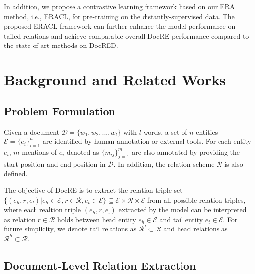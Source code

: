 \documentclass[11pt]{article}
\begin{document}
In addition, we propose a contrastive learning framework based on our ERA method, i.e., ERACL, for pre-training on the distantly-supervised data. The proposed ERACL framework can further enhance the model performance on tailed relations and achieve comparable overall DocRE performance compared to the state-of-art methods on DocRED.

\section{Background and Related Works}
\subsection{Problem Formulation}
Given a document $\mathcal{D}=\{w_1,w_2,...,w_l\}$ with $l$ words, a set of $n$ entities $\mathcal{E}= \{{e}_{i}\}^n_{i=1}$ are identified by human annotation or external tools. For each entity ${e}_i$, $m$ mentions of ${e}_i$ denoted as $\{m_{ij}\}^m_{j=1}$ are also annotated by providing the start position and end position in $\mathcal{D}$. In addition, the relation scheme $\mathcal{R}$ is also defined.

The objective of DocRE is to extract the relation triple set $\{(e_h,r,e_t)|e_h\in \mathcal{E},r\in \mathcal{R},e_t\in \mathcal{E}\} \subseteq \mathcal{E} \times \mathcal{R} \times \mathcal{E}$ from all possible relation triples, where each realtion triple $(e_h,r,e_t)$ extracted by the model can be interpreted as relation $r\in \mathcal{R}$ holds between head entity $e_h \in \mathcal{E}$ and tail entity $e_t \in \mathcal{E}$. For future simplicity, we denote tail relations as $\mathcal{R}^t \subset \mathcal{R}$ and head relations as $\mathcal{R}^h \subset \mathcal{R}$.
\subsection{Document-Level Relation Extraction}
\label{sec:docre-background}
\end{document}
